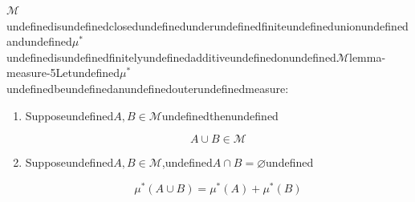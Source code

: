 \begin{mystthmlemma}{$\mathcal M$undefinedisundefinedclosedundefinedunderundefinedfiniteundefinedunionundefinedandundefined$\mu^{*}$undefinedisundefinedfinitelyundefinedadditiveundefinedonundefined$\mathcal M$}{lemma-measure-5}Letundefined$\mu^{*}$undefinedbeundefinedanundefinedouterundefinedmeasure:

\begin{enumerate}
\item Supposeundefined$A,B\in \mathcal M$undefinedthenundefined

\begin{equation}
A\cup B\in \mathcal M
\end{equation}


\item Supposeundefined$A,B\in \mathcal M$,undefined$A\cap B=\varnothing$undefined

\begin{equation}
\mu^{*}(A \cup B) = \mu^*(A)+\mu^*(B)
\end{equation}
\end{enumerate}

\end{mystthmlemma}
